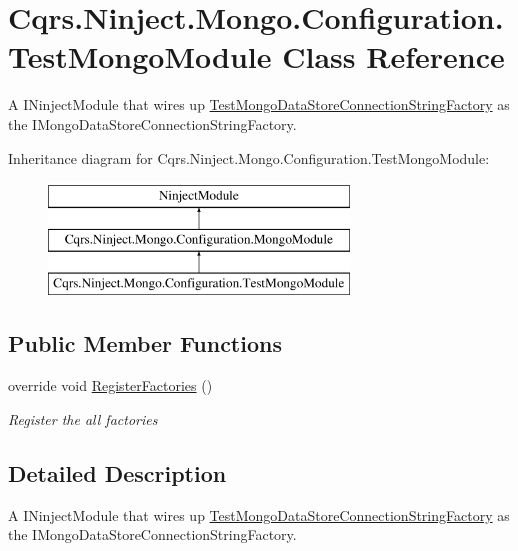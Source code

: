 \hypertarget{classCqrs_1_1Ninject_1_1Mongo_1_1Configuration_1_1TestMongoModule}{}\section{Cqrs.\+Ninject.\+Mongo.\+Configuration.\+Test\+Mongo\+Module Class Reference}
\label{classCqrs_1_1Ninject_1_1Mongo_1_1Configuration_1_1TestMongoModule}


A I\+Ninject\+Module that wires up \hyperlink{classCqrs_1_1Ninject_1_1Mongo_1_1TestMongoDataStoreConnectionStringFactory}{Test\+Mongo\+Data\+Store\+Connection\+String\+Factory} as the I\+Mongo\+Data\+Store\+Connection\+String\+Factory.  


Inheritance diagram for Cqrs.\+Ninject.\+Mongo.\+Configuration.\+Test\+Mongo\+Module\+:\begin{figure}[H]
\begin{center}
\leavevmode
\includegraphics[height=3.000000cm]{classCqrs_1_1Ninject_1_1Mongo_1_1Configuration_1_1TestMongoModule}
\end{center}
\end{figure}
\subsection*{Public Member Functions}
\begin{DoxyCompactItemize}
\item 
override void \hyperlink{classCqrs_1_1Ninject_1_1Mongo_1_1Configuration_1_1TestMongoModule_a8cce844ec177b88a0be2ca8f71b2bc6b_a8cce844ec177b88a0be2ca8f71b2bc6b}{Register\+Factories} ()
\begin{DoxyCompactList}\small\item\em Register the all factories \end{DoxyCompactList}\end{DoxyCompactItemize}


\subsection{Detailed Description}
A I\+Ninject\+Module that wires up \hyperlink{classCqrs_1_1Ninject_1_1Mongo_1_1TestMongoDataStoreConnectionStringFactory}{Test\+Mongo\+Data\+Store\+Connection\+String\+Factory} as the I\+Mongo\+Data\+Store\+Connection\+String\+Factory. 




